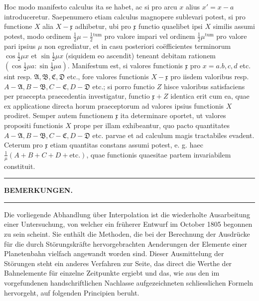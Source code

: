 Hoc modo manifesto calculus ita se habet, ac si pro arcu \(x\) alius \(x'=x-a\) introduceretur. Saepenumero etiam calculus magnopere sublevari potest, si pro functione \(X\) alia \(X-\mathfrak{x}\) adhibetur, ubi pro \(\mathfrak{x}\) functio quaelibet ipsi \(X\) similis assumi potest, modo ordinem \(\frac12\mu-\frac12{}^{\mathrm{tum}}\) pro valore impari vel ordinem \(\frac12\mu^{\mathrm{tum}}\) pro valore pari ipsius \(\mu\) non egrediatur, et in casu posteriori coëfficientes terminorum \(\cos\frac12\mu x\) et \(\sin\frac12\mu x\) (siquidem eo ascendit) teneant debitam rationem \((\cos\frac12\mu a:\sin\frac12\mu a)\). Manifestum est, si valores functionis \(\mathfrak{x}\) pro \(x=a.b,c,d\) etc. sint resp. \(\mathfrak{A},\mathfrak{B},\mathfrak{C},\mathfrak{D}\) etc., fore valores functionis \(X-\mathfrak{x}\) pro iisdem valoribus resp. \(A-\mathfrak{A},B-\mathfrak{B},C-\mathfrak{C},D-\mathfrak{D}\) etc.; si porro functio \(Z\) hisce valoribus satisfaciens per praecepta praecedentia investigatur, functio \(\mathfrak{x}+Z\) identica erit cum ea, quae ex applicatione directa horum praeceptorum ad valores ipsius functionis \(X\) prodiret. Semper autem functionem \(\mathfrak{x}\) ita determinare oportet, ut valores propositi functionis \(X\) prope per illam exhibeantur, quo pacto quantitates \(A-\mathfrak{A},B-\mathfrak{B},C-\mathfrak{C},D-\mathfrak{D}\) etc. parvae et ad calculum magis tractabiles evadent. Ceterum pro \(\mathfrak{x}\) etiam quantitas constans assumi potest, e. g. haec \(\frac1\mu(A+B+C+D+\text{etc.})\), quae functionis quaesitae partem invariabilem constituit.

\begin{center}\rule{0.28\linewidth}{0.4pt}\end{center}
\clearpage{}
\begin{center}\textbf{BEMERKUNGEN.}\end{center}
\begin{center}\rule{3em}{0.3pt}\end{center}

Die vorliegende Abhandlung über Interpolation ist die wiederholte Ausarbeitung einer Untersuchung,
von welcher ein früherer Entwurf im October 1805 begonnen zu sein scheint. Sie enthält die Methoden, die
bei der Berechnung der Ausdrücke für die durch Störungskräfte hervorgebrachten Aenderungen der Elemente
einer Planetenbahn vielfach angewandt worden sind. Dieser Ausmittelung der Störungen steht ein anderes
Verfahren zur Seite, das direct die Werthe der Bahnelemente für einzelne Zeitpunkte ergiebt und das,
wie aus den im vorgefundenen handschriftlichen Nachlasse aufgezeichneten schliesslichen Formeln hervorgeht,
auf folgenden Principien beruht.


